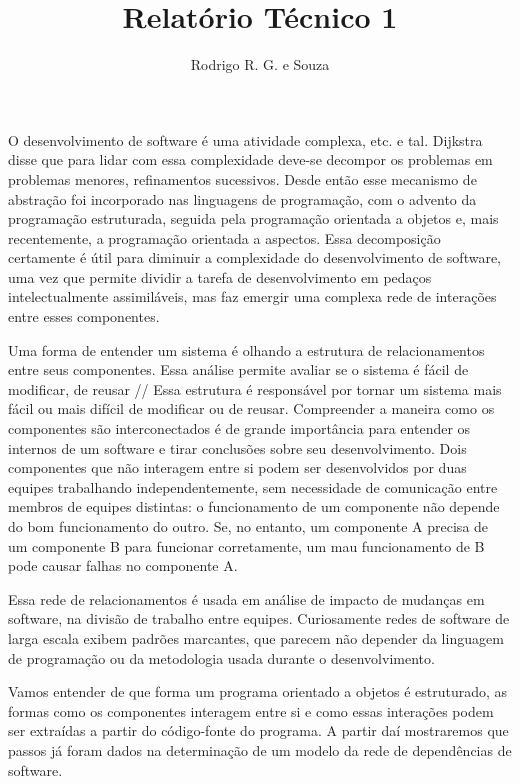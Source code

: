 \documentclass{article}
\begin{document}
\title{Relatório Técnico 1}
\author{Rodrigo R. G. e Souza}
\maketitle

O desenvolvimento de software é uma atividade complexa, etc. e tal. Dijkstra disse que para lidar com essa complexidade deve-se decompor os problemas em problemas menores, refinamentos sucessivos. Desde então esse mecanismo de abstração foi incorporado nas linguagens de programação, com o advento da programação estruturada, seguida pela programação orientada a objetos e, mais recentemente, a programação orientada a aspectos. Essa decomposição certamente é útil para diminuir a complexidade do desenvolvimento de software, uma vez que permite dividir a tarefa de desenvolvimento em pedaços intelectualmente assimiláveis, mas faz emergir uma complexa rede de interações entre esses componentes.

Uma forma de entender um sistema é olhando a estrutura de relacionamentos entre seus componentes. Essa análise permite avaliar se o sistema é fácil de modificar, de reusar // Essa estrutura é responsável por tornar um sistema mais fácil ou mais difícil de modificar ou de reusar.
Compreender a maneira como os componentes são interconectados é de grande importância para entender os internos de um software e tirar conclusões sobre seu desenvolvimento. Dois componentes que não interagem entre si podem ser desenvolvidos por duas equipes trabalhando independentemente, sem necessidade de comunicação entre membros de equipes distintas: o funcionamento de um componente não depende do bom funcionamento do outro. Se, no entanto, um componente A precisa de um componente B para funcionar corretamente, um mau funcionamento de B pode causar falhas no componente A.

Essa rede de relacionamentos é usada em análise de impacto de mudanças em software, na divisão de trabalho entre equipes. Curiosamente redes de software de larga escala exibem padrões marcantes, que parecem não depender da linguagem de programação ou da metodologia usada durante o desenvolvimento.

Vamos entender de que forma um programa orientado a objetos é estruturado, as formas como os componentes  interagem entre si e como essas interações podem ser extraídas a partir do código-fonte do programa. A partir daí mostraremos que passos já foram dados na determinação de um modelo da rede de dependências de software.
\end{document}
